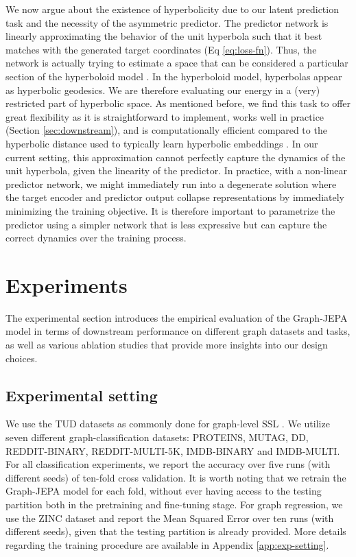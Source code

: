 \documentclass{article} \usepackage{iclr2024_conference,times}
\begin{document}
We now argue about the existence of hyperbolicity due to our latent prediction task and the necessity of the asymmetric predictor. The predictor network is linearly approximating the behavior of the unit hyperbola such that it best matches with the generated target coordinates (Eq \ref{eq:loss-fn}). Thus, the network is actually trying to estimate a space that can be considered a particular section of the hyperboloid model \citep{reynolds1993hyperbolic}. In the hyperboloid model, hyperbolas appear as hyperbolic geodesics. We are therefore evaluating our energy in a (very) restricted part of hyperbolic space. As mentioned before, we find this task to offer great flexibility as it is straightforward to implement, works well in practice (Section \ref{sec:downstream}), and is computationally efficient compared to the hyperbolic distance used to typically learn hyperbolic embeddings \citep{nickel2017poincare}. In our current setting, this approximation cannot perfectly capture the dynamics of the unit hyperbola, given the linearity of the predictor. In practice, with a non-linear predictor network, we might immediately run into a degenerate solution where the target encoder and predictor output collapse representations by immediately minimizing the training objective. It is therefore important to parametrize the predictor using a simpler network that is less expressive but can capture the correct dynamics over the training process.



\section{Experiments}
The experimental section introduces the empirical evaluation of the Graph-JEPA model in terms of downstream performance on different graph datasets and tasks, as well as various ablation studies that provide more insights into our design choices. 

\subsection{Experimental setting}
We use the TUD datasets \citep{Morris2020TUD} as commonly done for graph-level SSL \citep{suresh2021adversarial,tan2023s2gae}. We utilize seven different graph-classification datasets: PROTEINS, MUTAG, DD, REDDIT-BINARY, REDDIT-MULTI-5K, IMDB-BINARY and IMDB-MULTI. For all classification experiments, we report the accuracy over five runs (with different seeds) of ten-fold cross validation. It is worth noting that we retrain the Graph-JEPA model for each fold, without ever having access to the testing partition both in the pretraining and fine-tuning stage. For graph regression, we use the ZINC dataset and report the Mean Squared Error over ten runs (with different seeds), given that the testing partition is already provided. More details regarding the training procedure are available in Appendix \ref{app:exp-setting}.
\end{document}
